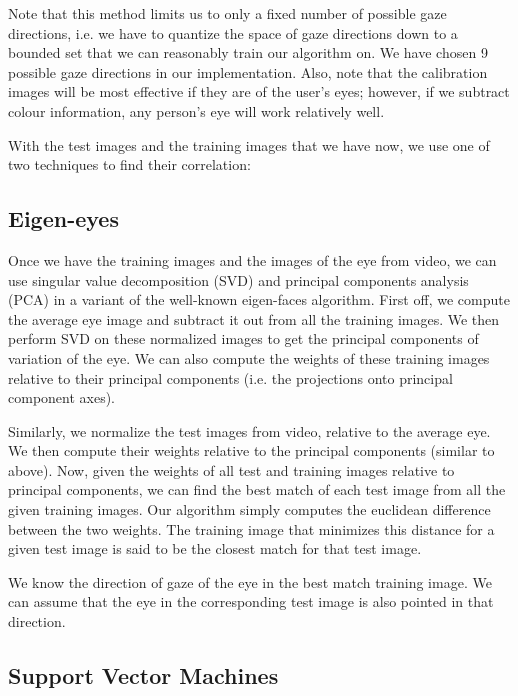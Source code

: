 \documentclass[12pt,letterpaper]{article}
\begin{document}
\begin{multicols}{2}
Note that this method limits us to only a fixed number of possible gaze directions, i.e. we have to
quantize the space of gaze directions down to a bounded set that we can reasonably train our algorithm 
on. We have chosen 9 possible gaze directions in our implementation. Also, note that the calibration 
images will be most effective if they are of the user's eyes; however, if we subtract colour information, 
any person's eye will work relatively well. 

With the test images and the training images that we have now, we use one of two techniques to find their
correlation:

\subsection{Eigen-eyes}
\label{scn:eigeneyes}

Once we have the training images and the images of the eye from video, we can use singular value 
decomposition (SVD) and principal components analysis (PCA) in a variant of the well-known eigen-faces 
algorithm. First off, we compute the average eye image and subtract it out from all the training images.
We then perform SVD on these normalized images to get the principal components of variation of the eye.
We can also compute the weights of these training images relative to their principal components (i.e. the
projections onto principal component axes).

Similarly, we normalize the test images from video, relative to the average eye. We then compute their
weights relative to the principal components (similar to above). Now, given the weights of all test
and training images relative to principal components, we can find the best match of each test image from
all the given training images. Our algorithm simply computes the euclidean difference between the two 
weights. The training image that minimizes this distance for a given test image is said to be the closest 
match for that test image. 

We know the direction of gaze of the eye in the best match training image. We can assume that the 
eye in the corresponding test image is also pointed in that direction.

\subsection{Support Vector Machines}
\label{scn:svm}


\end{multicols}
\end{document}
